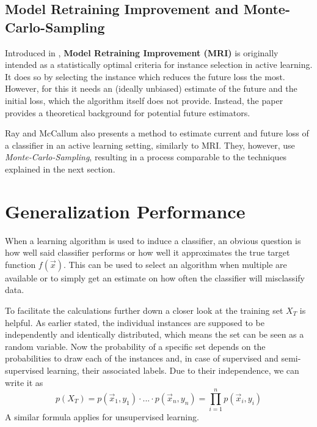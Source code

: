 \subsection{Model Retraining Improvement and Monte-Carlo-Sampling}
Introduced in \cite{EvansEtAl2015}, \textbf{Model Retraining Improvement (MRI)} is originally intended as a statistically optimal criteria for instance selection in active learning. It does so by selecting the instance which reduces the future loss the most. However, for this it needs an (ideally unbiased) estimate of the future and the initial loss, which the algorithm itself does not provide. Instead, the paper provides a theoretical background for potential future estimators.

Ray and McCallum \cite{RoyEtAl2001} also presents a method to estimate current and future loss of a classifier in an active learning setting, similarly to MRI. They, however, use \textit{Monte-Carlo-Sampling}, resulting in a process comparable to the techniques explained in the next section.

\section{Generalization Performance}
When a learning algorithm is used to induce a classifier, an obvious question is how well said classifier performs or how well it approximates the true target function $f(\vec{x})$. This can be used to select an algorithm when multiple are available or to simply get an estimate on how often the classifier will misclassify data.

To facilitate the calculations further down a closer look at the training set $X_T$ is helpful. As earlier stated, the individual instances are supposed to be independently and identically distributed, which means the set can be seen as a random variable. Now the probability of a specific set depends on the probabilities to draw each of the instances and, in case of supervised and semi-supervised learning, their associated labels. Due to their independence, we can write it as 
\begin{equation}
\label{eq:trainingSet}
p(X_T) = p(\vec{x}_1, y_1) \cdot ... \cdot p(\vec{x}_n, y_n) = \prod_{i=1}^{n} p(\vec{x}_i, y_i)
\end{equation}
A similar formula applies for unsupervised learning. \cite{RodriguezEtAl2013}

